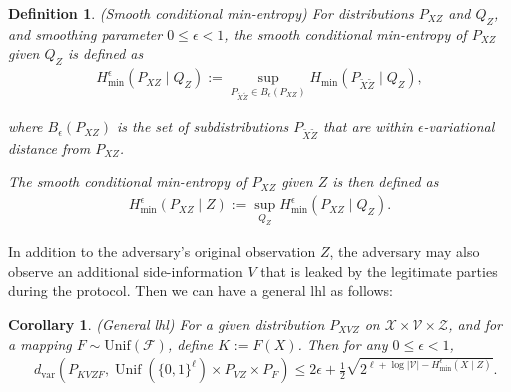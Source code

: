 \documentclass[onecolumn]{IEEEtran} %
\newcommand{\1}{\mathbbm{1}}
\theoremstyle{boldremark}
\newtheorem{corollary}{Corollary}
\newtheorem{definition}{Definition}
\DeclareMathOperator{\Unif}{Unif}
\begin{document}
\begin{definition} (Smooth conditional min-entropy) 
For distributions \( P_{XZ} \) and \( Q_Z \), and smoothing parameter \( 0 \leq \epsilon < 1 \), the smooth conditional min-entropy of \( P_{XZ} \) given \( Q_Z \) is defined as
\begin{align}\label{Def_smooth_min_entropy1}
    H_{\min}^{\epsilon}(P_{XZ} \mid Q_Z) := \sup_{P_{\tilde{X}\tilde{Z}} \in B_{\epsilon}(P_{XZ})} H_{\min}(P_{\tilde{X}\tilde{Z}} \mid Q_Z),    
\end{align}

where \( B_{\epsilon}(P_{XZ}) \) is the set of subdistributions \( P_{\tilde{X}\tilde{Z}} \) that are within \( \epsilon \)-variational distance from \( P_{XZ} \). 

The smooth conditional min-entropy of \( P_{XZ} \) given \( Z \) is then defined as
\begin{align}\label{Def_smooth_min_entropy2}
H_{\min}^{\epsilon}(P_{XZ} \mid Z) := \sup_{Q_Z} H_{\min}^{\epsilon}(P_{XZ} \mid Q_Z).
\end{align}
\end{definition}

In addition to the adversary's original observation $Z$, the adversary may also observe
an additional side-information $V$ that is leaked by the legitimate parties
during the protocol. Then we can have a general \gls{lhl} \cite[Sec. 7.5]{Watanabe} as follows:

\begin{corollary}(General \gls{lhl}) \label{Corollary_LHL}
For a given distribution \( P_{XVZ} \) on $\mathcal{X}\times\mathcal{V}\times\mathcal{Z}$, and for a mapping \( F \sim\mbox{Unif}(\mathcal F)\), define \( K := F(X) \). Then for any $0\le \epsilon<1$,
\begin{align}\label{EQ_LHL}
    &d_{\text{var}}(P_{KVZF}, \Unif(\{0,1\}^\ell) \times P_{VZ} \times P_F) \leq 2\epsilon + \frac{1}{2} \sqrt{2^{\ell + \log |\mathcal V| - H_{\min}^{\epsilon}(X \mid Z)}}.    
\end{align}
\end{corollary}
\end{document}
